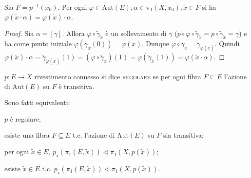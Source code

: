 \begin{thm} \label{mon_comm}
  Sia $F=p^{-1}(x_0)$. Per ogni $\varphi \in \text{Aut}(E), \alpha \in \pi_1(X, x_0), \tilde{x} \in F$ si ha $\varphi(\tilde{x} \cdot \alpha)=\varphi(\tilde{x}) \cdot \alpha$.
\end{thm}

\begin{proof}
  Sia $\alpha=[\gamma]$.
  Allora $\varphi \circ \tilde{\gamma}_{\tilde{x}}$ è un sollevamento di $\gamma$ ($p \circ \varphi \circ \tilde{\gamma}_{\tilde{x}}=p \circ \tilde{\gamma}_{\tilde{x}}=\gamma$) e ha come punto iniziale $\varphi(\tilde{\gamma}_{\tilde{x}}(0))=\varphi(\tilde{x})$.
  Dunque $\varphi \circ \tilde{\gamma}_{\tilde{x}}=\tilde{\gamma}_{\varphi(\tilde{x})}$.
  Quindi $\varphi(\tilde{x}) \cdot \alpha=\tilde{\gamma}_{\varphi(\tilde{x})}(1)=(\varphi \circ \tilde{\gamma}_{\tilde{x}})(1)=\varphi(\tilde{\gamma}_{\tilde{x}}(1))=\varphi(\tilde{x} \cdot \alpha)$.
\end{proof}

\begin{defn}
  $p:E \rightarrow X$ rivestimento connesso si dice \textsc{regolare} se per ogni fibra $F \subseteq E$ l'azione di $\text{Aut}(E)$ su $F$ è transitiva.
\end{defn}

\begin{thm}
  Sono fatti equivalenti:
  \begin{nlist}
    \item $p$ è regolare;
    \item esiste una fibra $F \subseteq E$ t.c. l'azione di $\text{Aut}(E)$ su $F$ sia transitiva;
    \item per ogni $\tilde{x} \in E$, $p_{\star}(\pi_1(E, \tilde{x})) \vartriangleleft \pi_1(X, p(\tilde{x}))$;
    \item esiste $\tilde{x} \in E$ t.c. $p_{\star}(\pi_1(E, \tilde{x})) \vartriangleleft \pi_1(X, p(\tilde{x}))$.
  \end{nlist}
\end{thm}

